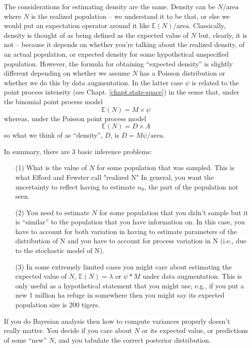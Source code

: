 

The considerations for estimating density are the same. Density can be
$N/\mbox{area}$ where $N$ is the realized population -- we understand it to
be that, or else we would put an expectation operator around it like
$\mathbb{E}(N)/\mbox{area}$.
Classically, density is thought of as being defined
as the expected value of $N$ but, clearly, it is not -- because it
depends on whether you're talking about the realized density, of an
actual population, or expected density for some hypothetical
unspecified population.
However, the formula for obtaining ``expected density''
is slightly different depending on
whether we assume $N$ has  a Poisson distribution or whether we do
this by data augmentation. In the latter case $\psi$ is related to the
point process intensity (see Chapt. \ref{chapt.state-space}) in the
sense that, under the binomial point process model
\[
\mathbb{E}(N) = M \times \psi
\]
whereas, under the Poisson point process model
\[
\mathbb{E}(N) = D \times A
\]
so what we think of as ``density'', $D$, is $ D = M \psi /\mbox{area}$.


In summary, there are 3 basic inference problems:
\begin{itemize}
\item[(1)] What is the value of $N$ for some population that was
  sampled.  This is what Efford and Fewster call "realized N" In
  general, you want the uncertainty to reflect having to estimate
  $n_{0}$, the part of the population not seen.
\item[(2)] You need to estimate $N$ for some population that you didn't
  sample but it is ``similar'' to the population that you have
  information on.  In this case, you have to account for both
  variation in having to estimate parameters of the distribution of N
  and you have to account for process variation in N (i.e., due to the
  stochastic model of N).
\item[(3)] In some extremely limited cases you might care about
  estimating the expected value of $N$, $\mathbb{E}(N) = \lambda$ or
  $\psi*M$ under data augmentation.  This is only useful as a
  hypothetical statement that you might use, e.g., if you put a new 1
  million ha refuge in somewhere then you might say its expected
  population size is 200 tigers.
\end{itemize}
If you do Bayesian analysis then how to compute variances properly
doesn't really matter. You
decide if you care about $N$ or its expected value, or predictions of
some ``new'' $N$,  and you tabulate
the correct posterior distribution.




